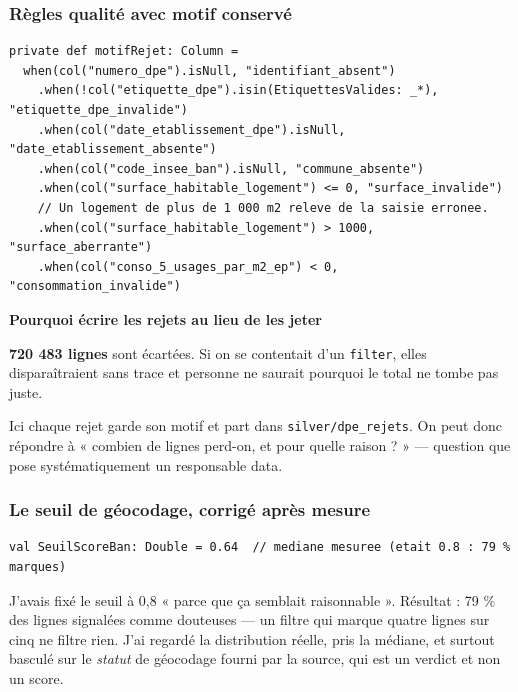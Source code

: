 \documentclass[11pt,a4paper]{article}
\newcommand{\cmd}[1]{\texttt{\small #1}}
\newcommand{\titrebloc}[1]{\textbf{\color{encre}#1}\par\vspace{0.25em}}
\begin{document}
\subsubsection{Règles qualité avec motif conservé}

\begin{lstlisting}[style=sc]
private def motifRejet: Column =
  when(col("numero_dpe").isNull, "identifiant_absent")
    .when(!col("etiquette_dpe").isin(EtiquettesValides: _*), "etiquette_dpe_invalide")
    .when(col("date_etablissement_dpe").isNull, "date_etablissement_absente")
    .when(col("code_insee_ban").isNull, "commune_absente")
    .when(col("surface_habitable_logement") <= 0, "surface_invalide")
    // Un logement de plus de 1 000 m2 releve de la saisie erronee.
    .when(col("surface_habitable_logement") > 1000, "surface_aberrante")
    .when(col("conso_5_usages_par_m2_ep") < 0, "consommation_invalide")
\end{lstlisting}

\begin{pourquoi}
\titrebloc{Pourquoi écrire les rejets au lieu de les jeter}
\textbf{720 483 lignes} sont écartées. Si on se contentait d'un
\cmd{filter}, elles disparaîtraient sans trace et personne ne saurait
pourquoi le total ne tombe pas juste.

Ici chaque rejet garde son motif et part dans \cmd{silver/dpe\_rejets}. On
peut donc répondre à « combien de lignes perd-on, et pour quelle raison ? » —
question que pose systématiquement un responsable data.
\end{pourquoi}

\subsubsection{Le seuil de géocodage, corrigé après mesure}

\begin{lstlisting}[style=sc]
val SeuilScoreBan: Double = 0.64  // mediane mesuree (etait 0.8 : 79 % marques)
\end{lstlisting}

\begin{attention}
J'avais fixé le seuil à 0{,}8 « parce que ça semblait raisonnable ». Résultat :
79 \% des lignes signalées comme douteuses — un filtre qui marque quatre lignes
sur cinq ne filtre rien. J'ai regardé la distribution réelle, pris la médiane,
et surtout basculé sur le \emph{statut} de géocodage fourni par la source,
qui est un verdict et non un score.
\end{attention}
\end{document}
